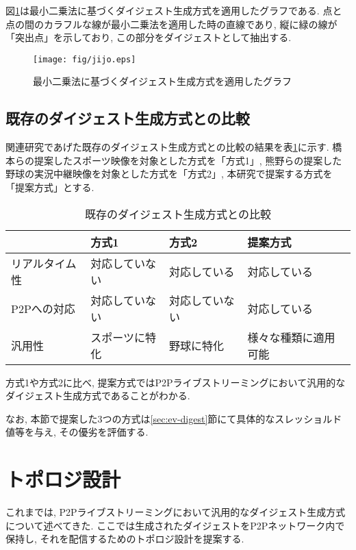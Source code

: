 図\ref{fig:jijo}は最小二乗法に基づくダイジェスト生成方式を適用したグラフである. 点と点の間のカラフルな線が最小二乗法を適用した時の直線であり, 縦に緑の線が「突出点」を示しており, この部分をダイジェストとして抽出する.

\begin{figure}[h]
  \centering
  \texttt{[image: fig/jijo.eps]}
  \caption{最小二乗法に基づくダイジェスト生成方式を適用したグラフ}
  \label{fig:jijo}
\end{figure}

\newpage

\subsection{既存のダイジェスト生成方式との比較}
関連研究であげた既存のダイジェスト生成方式との比較の結果を表\ref{tbl:compare-digest}に示す. 橋本らの提案したスポーツ映像を対象とした方式を「方式1」, 熊野らの提案した野球の実況中継映像を対象とした方式を「方式2」, 本研究で提案する方式を「提案方式」とする.

\begin{table}[h]
  \caption{既存のダイジェスト生成方式との比較}
  \label{tbl:compare-digest}
  \centering
      {\small
        \begin{tabular}{|l|l|l|l|}
          \hline
          & 方式1 & 方式2 & 提案方式 \\ \hline \hline
          リアルタイム性 & 対応していない & 対応している & 対応している \\ \hline
          P2Pへの対応 & 対応していない & 対応していない & 対応している \\ \hline
          汎用性 & スポーツに特化 & 野球に特化 & 様々な種類に適用可能 \\ \hline
        \end{tabular}
      }
\end{table}

方式1や方式2に比べ, 提案方式ではP2Pライブストリーミングにおいて汎用的なダイジェスト生成方式であることがわかる.

なお, 本節で提案した3つの方式は\ref{sec:ev-digest}節にて具体的なスレッショルド値等を与え, その優劣を評価する.

\section{トポロジ設計}\label{sec:pro-topology}
これまでは, P2Pライブストリーミングにおいて汎用的なダイジェスト生成方式について述べてきた. ここでは生成されたダイジェストをP2Pネットワーク内で保持し, それを配信するためのトポロジ設計を提案する.


